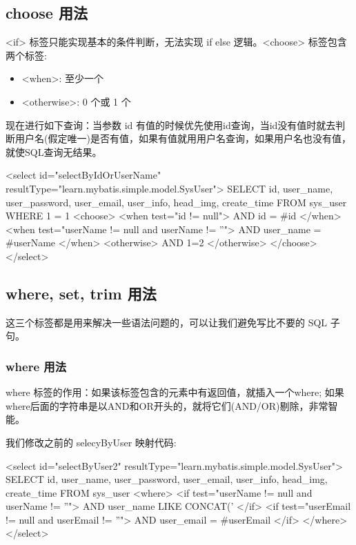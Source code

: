 \subsection{choose 用法}

<if> 标签只能实现基本的条件判断，无法实现 if else 逻辑。<choose> 标签包含两个标签: 
\begin{itemize}
    \item <when>: 至少一个
    \item <otherwise>: 0 个或 1 个
\end{itemize}

现在进行如下查询：当参数 id 有值的时候优先使用id查询，当id没有值时就去判断用户名(假定唯一)是否有值，如果有值就用用户名查询，如果用户名也没有值，就使SQL查询无结果。

\begin{xml}
<select id="selectByIdOrUserName" resultType="learn.mybatis.simple.model.SysUser">
    SELECT id, user_name, user_password, user_email, user_info, head_img, create_time
    FROM sys_user
    WHERE 1 = 1
    <choose>
        <when test="id != null">
            AND id = #{id}
        </when>
        <when test="userName != null and userName != ''">
            AND user_name = #{userName}
        </when>
        <otherwise>
            AND 1=2
        </otherwise>
    </choose>
</select>
\end{xml}

\subsection{where, set, trim 用法}

这三个标签都是用来解决一些语法问题的，可以让我们避免写比不要的 SQL 子句。

\subsubsection*{where 用法}

where 标签的作用：如果该标签包含的元素中有返回值，就插入一个where; 如果where后面的字符串是以AND和OR开头的，就将它们(AND/OR)剔除，非常智能。

我们修改之前的 selecyByUser 映射代码:

\begin{xml}
<select id="selectByUser2" resultType="learn.mybatis.simple.model.SysUser">
    SELECT id, user_name, user_password, user_email, user_info, head_img, create_time
        FROM sys_user
        <where>
            <if test="userName != null and userName != ''">
                AND user_name LIKE CONCAT('%
            </if>
            <if test="userEmail != null and userEmail != ''">
                AND user_email = #{userEmail}
            </if>
        </where>
</select>
\end{xml}

